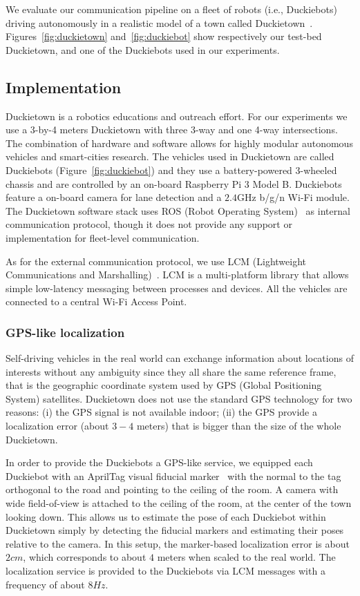 We evaluate our communication pipeline on a fleet of robots (i.e., Duckiebots) driving autonomously in a 
realistic model of a town called Duckietown~\cite{paull2017duckietown}. Figures~\ref{fig:duckietown} 
and~\ref{fig:duckiebot} show respectively our test-bed Duckietown, and one of the Duckiebots used in our 
experiments.

\subsection{Implementation}
Duckietown is a robotics educations and outreach effort. For our experiments we use a 3-by-4 meters Duckietown
with three 3-way and one 4-way intersections. 
The combination of hardware and software allows for highly modular autonomous vehicles and smart-cities research. 
The vehicles used in Duckietown are called Duckiebots (Figure~\ref{fig:duckiebot}) and they use a battery-powered 3-wheeled 
chassis and are controlled by an on-board Raspberry Pi 3 Model B. Duckiebots feature a on-board camera for lane detection and 
a $2.4$GHz b/g/n Wi-Fi module. The Duckietown software stack uses ROS (Robot Operating System)~\cite{quigley2009ros} 
as internal communication protocol, though it does not provide any support or implementation for fleet-level communication.

As for the external communication protocol, we use LCM (Lightweight Communications and Marshalling)~\citep{huang2010lcm}.
LCM is a multi-platform library that allows simple low-latency messaging between processes and devices. All the vehicles are 
connected to a central Wi-Fi Access Point.


\subsubsection{GPS-like localization}
Self-driving vehicles in the real world can exchange information about locations of interests without any ambiguity since
they all share the same reference frame, that is the geographic coordinate system used by GPS (Global Positioning System) satellites.
Duckietown does not use the standard GPS technology for two reasons: (i) the GPS signal is not available indoor; (ii) the GPS provide
a localization error (about $3-4$ meters) that is bigger than the size of the whole Duckietown.

In order to provide the Duckiebots a GPS-like service, we equipped each Duckiebot with an AprilTag visual fiducial 
marker~\cite{olson2011tags} with the normal to the tag orthogonal to the road and pointing to the ceiling of the room.
A camera with wide field-of-view is attached to the ceiling of the room, at the center of the town looking down. This allows
us to estimate the pose of each Duckiebot within Duckietown simply by detecting the fiducial markers and estimating their
poses relative to the camera.
In this setup, the marker-based localization error is about $2cm$, which corresponds to about $4$ meters when scaled to the real world.
The localization service is provided to the Duckiebots via LCM messages with a frequency of about $8Hz$.


